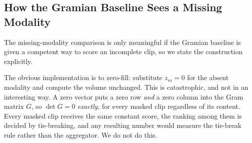 

%
%

\subsection{How the Gramian Baseline Sees a Missing Modality}
\label{sec:maskedvol}

The missing-modality comparison is only meaningful if the Gramian
baseline is given a competent way to score an incomplete clip, so we
state the construction explicitly.

The obvious implementation is to zero-fill: substitute $z_m = 0$ for the
absent modality and compute the volume unchanged. This is catastrophic,
and not in an interesting way. A zero vector puts a zero row \emph{and}
a zero column into the Gram matrix $G$, so $\det G = 0$ \emph{exactly},
for every masked clip regardless of its content. Every masked clip
receives the same constant score, the ranking among them is decided by
tie-breaking, and any resulting number would measure the tie-break rule
rather than the aggregator. We do not do this.

